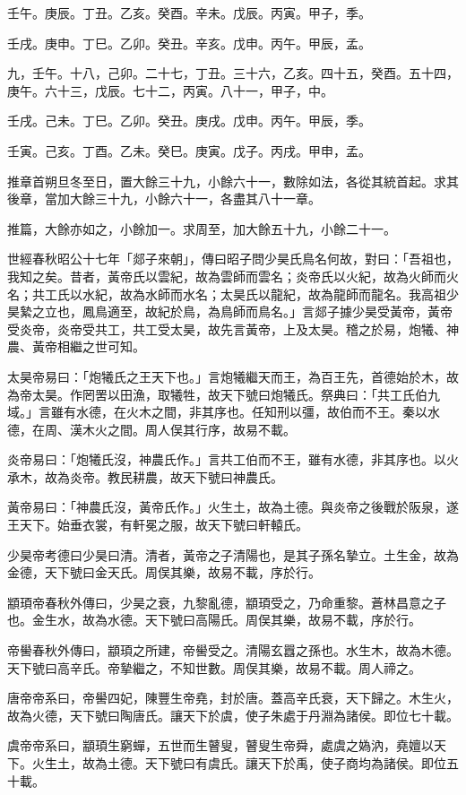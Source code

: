 \begin{pinyinscope}
壬午。庚辰。丁丑。乙亥。癸酉。辛未。戊辰。丙寅。甲子，季。

壬戌。庚申。丁巳。乙卯。癸丑。辛亥。戊申。丙午。甲辰，孟。

九，壬午。十八，己卯。二十七，丁丑。三十六，乙亥。四十五，癸酉。五十四，庚午。六十三，戊辰。七十二，丙寅。八十一，甲子，中。

壬戌。己未。丁巳。乙卯。癸丑。庚戌。戊申。丙午。甲辰，季。

壬寅。己亥。丁酉。乙未。癸巳。庚寅。戊子。丙戌。甲申，孟。

推章首朔旦冬至日，置大餘三十九，小餘六十一，數除如法，各從其統首起。求其後章，當加大餘三十九，小餘六十一，各盡其八十一章。

推篇，大餘亦如之，小餘加一。求周至，加大餘五十九，小餘二十一。

世經春秋昭公十七年「郯子來朝」，傳曰昭子問少昊氏鳥名何故，對曰：「吾祖也，我知之矣。昔者，黃帝氏以雲紀，故為雲師而雲名；炎帝氏以火紀，故為火師而火名；共工氏以水紀，故為水師而水名；太昊氏以龍紀，故為龍師而龍名。我高祖少昊縶之立也，鳳鳥適至，故紀於鳥，為鳥師而鳥名。」言郯子據少昊受黃帝，黃帝受炎帝，炎帝受共工，共工受太昊，故先言黃帝，上及太昊。稽之於易，炮犧、神農、黃帝相繼之世可知。

太昊帝易曰：「炮犧氏之王天下也。」言炮犧繼天而王，為百王先，首德始於木，故為帝太昊。作罔罟以田漁，取犧牲，故天下號曰炮犧氏。祭典曰：「共工氏伯九域。」言雖有水德，在火木之間，非其序也。任知刑以彊，故伯而不王。秦以水德，在周、漢木火之間。周人俣其行序，故易不載。

炎帝易曰：「炮犧氏沒，神農氏作。」言共工伯而不王，雖有水德，非其序也。以火承木，故為炎帝。教民耕農，故天下號曰神農氏。

黃帝易曰：「神農氏沒，黃帝氏作。」火生土，故為土德。與炎帝之後戰於阪泉，遂王天下。始垂衣裳，有軒冕之服，故天下號曰軒轅氏。

少昊帝考德曰少昊曰清。清者，黃帝之子清陽也，是其子孫名摯立。土生金，故為金德，天下號曰金天氏。周俣其樂，故易不載，序於行。

顓頊帝春秋外傳曰，少昊之衰，九黎亂德，顓頊受之，乃命重黎。蒼林昌意之子也。金生水，故為水德。天下號曰高陽氏。周俣其樂，故易不載，序於行。

帝嚳春秋外傳曰，顓頊之所建，帝嚳受之。清陽玄囂之孫也。水生木，故為木德。天下號曰高辛氏。帝摯繼之，不知世數。周俣其樂，故易不載。周人禘之。

唐帝帝系曰，帝嚳四妃，陳豐生帝堯，封於唐。蓋高辛氏衰，天下歸之。木生火，故為火德，天下號曰陶唐氏。讓天下於虞，使子朱處于丹淵為諸侯。即位七十載。

虞帝帝系曰，顓頊生窮蟬，五世而生瞽叟，瞽叟生帝舜，處虞之媯汭，堯嬗以天下。火生土，故為土德。天下號曰有虞氏。讓天下於禹，使子商均為諸侯。即位五十載。


\end{pinyinscope}
